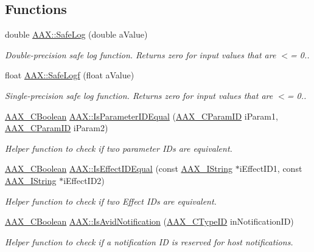 \subsection*{Functions}
\begin{DoxyCompactItemize}
\item 
double \hyperlink{a00288_ae8de30637f08cd29bb0e27526ce9e21b}{A\+A\+X\+::\+Safe\+Log} (double a\+Value)
\begin{DoxyCompactList}\small\item\em Double-\/precision safe log function. Returns zero for input values that are $<$= 0.. \end{DoxyCompactList}\item 
float \hyperlink{a00288_ad762727aac31ad8b7bba8b67a4bc2edc}{A\+A\+X\+::\+Safe\+Logf} (float a\+Value)
\begin{DoxyCompactList}\small\item\em Single-\/precision safe log function. Returns zero for input values that are $<$= 0.. \end{DoxyCompactList}\item 
\hyperlink{a00149_aa216506530f1d19a2965931ced2b274b}{A\+A\+X\+\_\+\+C\+Boolean} \hyperlink{a00288_ae4d1a0a925aa954899fec653dc041b75}{A\+A\+X\+::\+Is\+Parameter\+I\+D\+Equal} (\hyperlink{a00149_a1440c756fe5cb158b78193b2fc1780d1}{A\+A\+X\+\_\+\+C\+Param\+I\+D} i\+Param1, \hyperlink{a00149_a1440c756fe5cb158b78193b2fc1780d1}{A\+A\+X\+\_\+\+C\+Param\+I\+D} i\+Param2)
\begin{DoxyCompactList}\small\item\em Helper function to check if two parameter I\+Ds are equivalent. \end{DoxyCompactList}\item 
\hyperlink{a00149_aa216506530f1d19a2965931ced2b274b}{A\+A\+X\+\_\+\+C\+Boolean} \hyperlink{a00288_aef81989128dcac01f2be8fd25096540f}{A\+A\+X\+::\+Is\+Effect\+I\+D\+Equal} (const \hyperlink{a00113}{A\+A\+X\+\_\+\+I\+String} $\ast$i\+Effect\+I\+D1, const \hyperlink{a00113}{A\+A\+X\+\_\+\+I\+String} $\ast$i\+Effect\+I\+D2)
\begin{DoxyCompactList}\small\item\em Helper function to check if two Effect I\+Ds are equivalent. \end{DoxyCompactList}\item 
\hyperlink{a00149_aa216506530f1d19a2965931ced2b274b}{A\+A\+X\+\_\+\+C\+Boolean} \hyperlink{a00288_ab63efd791ab1cbbcdb004302b106c45c}{A\+A\+X\+::\+Is\+Avid\+Notification} (\hyperlink{a00149_ac678f9c1fbcc26315d209f71a147a175}{A\+A\+X\+\_\+\+C\+Type\+I\+D} in\+Notification\+I\+D)
\begin{DoxyCompactList}\small\item\em Helper function to check if a notification I\+D is reserved for host notifications. \end{DoxyCompactList}\end{DoxyCompactItemize}


